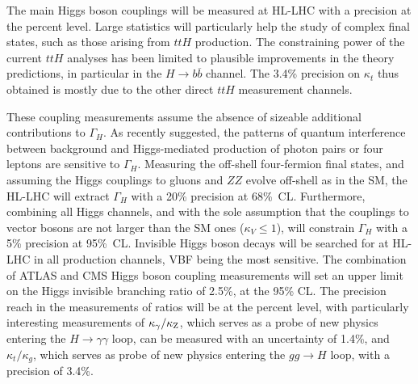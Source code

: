 \documentclass[../report.tex]{subfiles}
\begin{document}
The main Higgs boson couplings will be measured at HL-LHC with a precision at the percent level. Large statistics will particularly help the study of complex final states, such as those arising from $ttH$ production. 
The constraining power of the current $ttH$ analyses has been limited to plausible improvements in the theory predictions, in particular in the $H\rightarrow b\overline{b}$ channel. The 3.4\% precision on $\kappa_t$ thus obtained is mostly due to the other direct $ttH$ measurement channels.


These coupling measurements assume the absence of sizeable additional contributions to $\Gamma_H$. As recently suggested, the patterns of quantum interference between background and Higgs-mediated production of photon pairs or four leptons are sensitive to $\Gamma_H$. Measuring the off-shell four-fermion final states, and assuming the Higgs couplings to gluons and $ZZ$ evolve off-shell as in the SM, the HL-LHC will extract $\Gamma_H$ with a 20\% precision at 68\%~CL.
Furthermore, combining all Higgs channels, and with the sole assumption that the couplings to vector bosons are not  larger than the SM ones ($\kappa_V\le 1$), will constrain $\Gamma_H$ with a 5\% precision at 95\%~CL. Invisible Higgs boson decays will be searched for at HL-LHC in all production channels, VBF being the most sensitive. The combination of ATLAS and CMS Higgs boson coupling measurements will set an upper limit on the Higgs invisible branching ratio of 2.5\%, at the 95\% CL.  The precision reach in the measurements of ratios will be at the percent level, with particularly interesting measurements of $\kappa_{\gamma}/\kappa_{\rm Z}$, which serves as a probe of new physics entering the $H \rightarrow \gamma\gamma$ loop, can be measured with an uncertainty of 1.4\%, and $\kappa_{t}/\kappa_{g}$, which serves as probe of new physics entering the $gg \rightarrow H$ loop, with a precision of 3.4\%.
\end{document}

